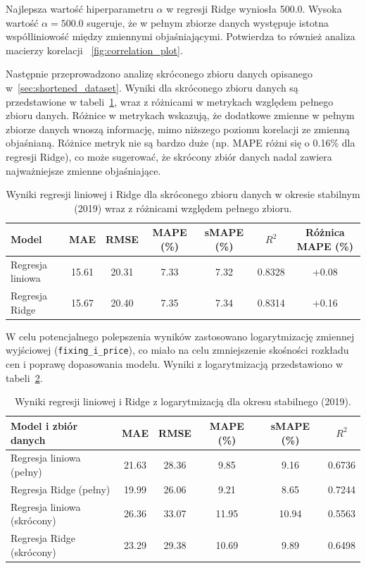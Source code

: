 Najlepsza wartość hiperparametru \(\alpha\) w regresji Ridge wyniosła 500.0. Wysoka wartość \(\alpha = 500.0\) sugeruje, że w pełnym zbiorze danych występuje istotna współliniowość między zmiennymi objaśniającymi. Potwierdza to również analiza macierzy korelacji ~\ref{fig:correlation_plot}.

Następnie przeprowadzono analizę skróconego zbioru danych opisanego w~\ref{sec:shortened_dataset}. Wyniki dla skróconego zbioru danych są przedstawione w tabeli~\ref{tab:linear_ridge_results_short}, wraz z różnicami w metrykach względem pełnego zbioru danych. Różnice w metrykach wskazują, że dodatkowe zmienne w pełnym zbiorze danych wnoszą informację, mimo niższego poziomu korelacji ze zmienną objaśnianą. Różnice metryk nie są bardzo duże (np. MAPE różni się o 0.16\% dla regresji Ridge), co może sugerować, że skrócony zbiór danych nadal zawiera najważniejsze zmienne objaśniające.

\begin{table}[h]
    \centering
    \caption{Wyniki regresji liniowej i Ridge dla skróconego zbioru danych w okresie stabilnym (2019) wraz z różnicami względem pełnego zbioru.}
    \label{tab:linear_ridge_results_short}
    \begin{tabular}{|l|ccccc|c|}
        \hline
        \textbf{Model} & \textbf{MAE} & \textbf{RMSE} & \textbf{MAPE (\%)} & \textbf{sMAPE (\%)} & \textbf{\(R^2\)} & \textbf{Różnica MAPE (\%)} \\
        \hline
        Regresja liniowa & 15.61 & 20.31 & 7.33 & 7.32 & 0.8328 & +0.08 \\
        Regresja Ridge   & 15.67 & 20.40 & 7.35 & 7.34 & 0.8314 & +0.16 \\
        \hline
    \end{tabular}
\end{table}

W celu potencjalnego polepszenia wyników zastosowano logarytmizację zmiennej wyjściowej (\texttt{fixing\_i\_price}), co miało na celu zmniejszenie skośności rozkładu cen i poprawę dopasowania modelu. Wyniki z logarytmizacją przedstawiono w tabeli~\ref{tab:linear_ridge_results_log}.

\begin{table}[h]
    \centering
    \caption{Wyniki regresji liniowej i Ridge z logarytmizacją dla okresu stabilnego (2019).}
    \label{tab:linear_ridge_results_log}
    \begin{tabular}{|l|ccccc|}
        \hline
        \textbf{Model i zbiór danych} & \textbf{MAE} & \textbf{RMSE} & \textbf{MAPE (\%)} & \textbf{sMAPE (\%)} & \textbf{\(R^2\)} \\
        \hline
        Regresja liniowa (pełny)   & 21.63 & 28.36 & 9.85 & 9.16 & 0.6736 \\
        Regresja Ridge (pełny)     & 19.99 & 26.06 & 9.21 & 8.65 & 0.7244 \\
        Regresja liniowa (skrócony) & 26.36 & 33.07 & 11.95 & 10.94 & 0.5563 \\
        Regresja Ridge (skrócony)   & 23.29 & 29.38 & 10.69 & 9.89 & 0.6498 \\
        \hline
    \end{tabular}
\end{table}

